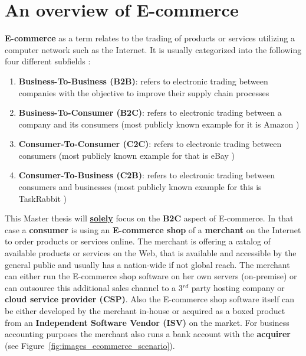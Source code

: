 
\section{An overview of E-commerce}
\label{sec:e_commerce_scenario}

\textbf{E-commerce} as a term relates to the trading of products or services utilizing a computer network such as the Internet. It is usually categorized into the following four different subfields \citep{sen2015study}:\@

\begin{enumerate}
  \item \textbf{Business-To-Business (\gls{B2B})}: refers to electronic trading between companies with the objective to improve their supply chain processes
  \item \textbf{Business-To-Consumer (\gls{B2C})}: refers to electronic trading between a company and its consumers (most publicly known example for it is Amazon \citep{Amazon.com})
  \item \textbf{Consumer-To-Consumer (\gls{C2C})}: refers to electronic trading between consumers (most publicly known example for that is eBay \citep{eBayInc})
  \item \textbf{Consumer-To-Business (\gls{C2B})}: refers to electronic trading between consumers and businesses (most publicly known example for this is TaskRabbit \citep{TaskRabbit})
\end{enumerate}

This Master thesis will \textbf{\underline{solely}} focus on the \textbf{\gls{B2C}} aspect of E-commerce. In that case a \textbf{consumer} is using an \textbf{E-commerce shop} of a \textbf{merchant} on the Internet to order products or services online. The merchant is offering a catalog of available products or services on the Web, that is available and accessible by the general public and usually has a nation-wide if not global reach. The merchant can either run the E-commerce shop software on her own servers (on-premise) or can outsource this additional sales channel to a 3$^{rd}$ party hosting company or \textbf{cloud service provider (\gls{CSP})}. Also the E-commerce shop software itself can be either developed by the merchant in-house or acquired as a boxed product from an \textbf{Independent Software Vendor (\gls{ISV})} on the market. For business accounting purposes the merchant also runs a bank account with the \textbf{acquirer} (see Figure~\ref{fig:images_ecommerce_scenario}). \\

